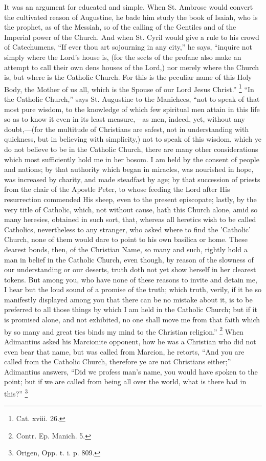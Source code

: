 It was an argument for educated and simple. When St.
Ambrose would convert the cultivated reason of Augustine,
he bade him study the book of Isaiah, who is the prophet,
as of the Messiah, so of the calling of the Gentiles and
of the Imperial power of the Church. And when St. Cyril
would give a rule to his crowd of Catechumens, ``If
ever thou art sojourning in any city,'' he says,
``inquire not simply where the Lord's house is, (for
the sects of the profane also make an attempt to call
their own dens houses of the Lord,) nor merely where the
Church is, but where is the Catholic Church. For this is
the peculiar name of this Holy Body, the Mother of us
all, which is the Spouse of our Lord Jesus Christ.''
\footnote{Cat. xviii. 26.}
``In the Catholic Church,'' says St. Augustine to
the Manichees, ``not to speak of that most pure
wisdom, to the knowledge of which few spiritual men
attain in this life so as to know it even in its least
measure,—as men, indeed, yet, without any
doubt,—(for the multitude of Christians are safest,
not in understanding with quickness, but in believing
with simplicity,) not to speak of this wisdom, which ye
do not believe to be in the Catholic Church, there are
many other considerations which most sufficiently hold me
in her bosom. I am held by the consent of people and
nations; by that authority which began in miracles, was
nourished in hope, was increased by charity, and made
steadfast by age; by that succession of priests from the
chair of the Apostle Peter, to whose feeding the Lord
after His resurrection commended His sheep, even to the
present episcopate; lastly, by the very title of
Catholic, which, not without cause, hath this Church
alone, amid so many heresies, obtained in such sort,
that, whereas all heretics wish to be called Catholics,
nevertheless to any stranger, who asked where to find the
'Catholic' Church, none of them would dare to point to
his own basilica or home. These dearest bonds, then, of
the Christian Name, so many and such, rightly hold a man
in belief in the Catholic Church, even though, by reason
of the slowness of our understanding or our deserts,
truth doth not yet show herself in her clearest tokens.
But among you, who have none of these reasons to invite
and detain me, I hear but the loud sound of a promise of
the truth; which truth, verily, if it be so manifestly
displayed among you that there can be no mistake about
it, is to be preferred to all those things by which I am
held in the Catholic Church; but if it is promised alone,
and not exhibited, no one shall move me from that faith
which by so many and great ties binds my mind to the
Christian religion.'' \footnote{Contr. Ep. Manich. 5.} When Adimantius asked his
Marcionite opponent, how he was a Christian who did not
even bear that name, but was called from Marcion, he
retorts, ``And you are called from the Catholic
Church, therefore ye are not Christians either;''
Adimantius answers, ``Did we profess man's name, you
would have spoken to the point; but if we are called from
being all over the world, what is there bad in
this?'' \footnote{Origen, Opp. t. i. p. 809.}

